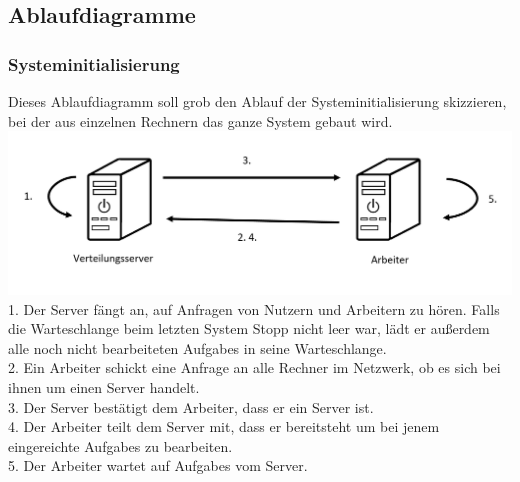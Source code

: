 \documentclass[a4paper,12pt]{article}
\begin{document}
\subsection{Ablaufdiagramme}
\begin{minipage}[t]{\linewidth}
\subsubsection{Systeminitialisierung}
Dieses Ablaufdiagramm soll grob den Ablauf der Systeminitialisierung skizzieren, bei der aus einzelnen Rechnern das ganze System gebaut wird.\\

\includegraphics[width=\linewidth]{Systemmodelle/Models/Init.PNG}
\\
1. Der \gls{Server} fängt an, auf Anfragen von Nutzern und Arbeitern zu hören. Falls die \gls{Warteschlange} beim letzten System Stopp nicht leer war, lädt er außerdem alle noch nicht bearbeiteten \glspl{Aufgabe} in seine \gls{Warteschlange}.\\
2. Ein \gls{Arbeiter} schickt eine Anfrage an alle Rechner im Netzwerk, ob es sich bei ihnen um einen \gls{Server} handelt. \\
3. Der \gls{Server} bestätigt dem \gls{Arbeiter}, dass er ein \gls{Server} ist.\\
4. Der \gls{Arbeiter} teilt dem \gls{Server} mit, dass er bereitsteht um bei jenem eingereichte \glspl{Aufgabe} zu bearbeiten.\\
5. Der \gls{Arbeiter} wartet auf \glspl{Aufgabe} vom \gls{Server}.
\end{minipage}
\end{document}
